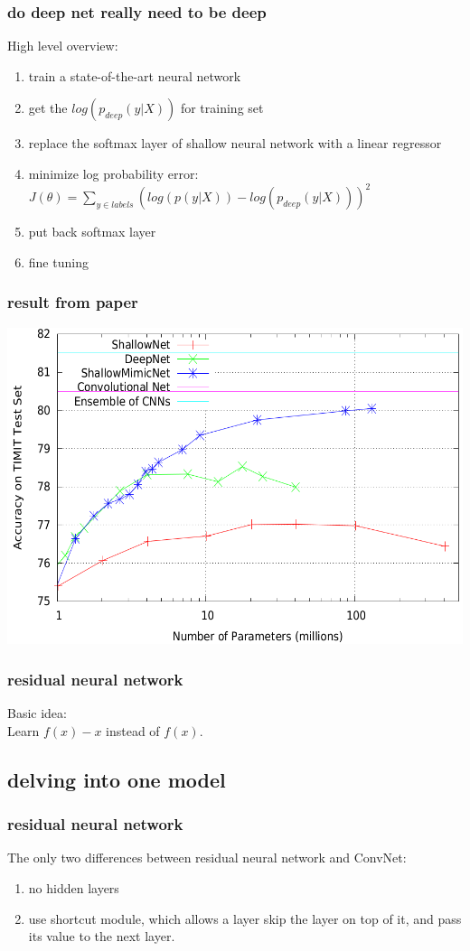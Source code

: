 \documentclass{beamer}
\begin{document}
\begin{frame}
\frametitle{do deep net really need to be deep}
High level overview:
\begin{enumerate}
\item train a state-of-the-art neural network
\item get the $log(p_{deep}(y|X))$ for training set
\item replace the softmax layer of shallow neural network with a linear regressor
\item minimize log probability error: $J(\theta)=\sum_{y\in labels}(log(p(y|X))-log(p_{deep}(y|X)))^2$
\item put back softmax layer
\item fine tuning
\end{enumerate}
\end{frame}
\begin{frame}
\frametitle{result from paper}
\includegraphics[width=.8\textwidth]{mimic.png}
\end{frame}

\begin{frame}
\frametitle{residual neural network}
Basic idea:\\
Learn $f(x)-x$ instead of $f(x)$.
\end{frame}
\subsection{delving into one model}
\begin{frame}
\frametitle{residual neural network}
The only two differences between residual neural network and ConvNet:
\begin{enumerate}
\item no hidden layers
\item use shortcut module, which allows a layer skip the layer on top of it,
 and pass its value to the next layer.
\end{enumerate}
\end{frame}
\end{document}
